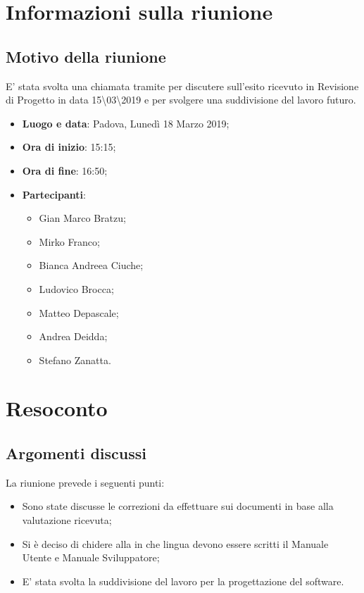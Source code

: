 \documentclass[a4paper,12pt]{article}
\begin{document}
	\tableofcontents
	\cleardoublepage
	\section{Informazioni sulla riunione}
	\subsection{Motivo della riunione} E' stata svolta una chiamata tramite   per discutere sull'esito ricevuto in Revisione di Progetto in data 15\textbackslash03\textbackslash2019 e per svolgere una suddivisione del lavoro futuro.
	\begin{itemize}
		\item \textbf{Luogo e data}: Padova, Lunedì \label{key}18 Marzo 2019;
		\item \textbf{Ora di inizio}: 15:15;
		\item \textbf{Ora di fine}: 16:50;
		\item \textbf{Partecipanti}:  
		\begin{itemize}
			\item Gian Marco Bratzu;
			\item Mirko Franco;
			\item Bianca Andreea Ciuche;
			\item Ludovico Brocca;
			\item Matteo Depascale;
			\item Andrea Deidda;
			\item Stefano Zanatta.
		\end{itemize}
	\end{itemize}
	
	
	\section{Resoconto}
	\subsection{Argomenti discussi}
	La riunione prevede i seguenti punti:
	\begin{itemize}		
		\item Sono state discusse le correzioni da effettuare sui documenti in base alla valutazione ricevuta;
		\item Si è deciso di chidere alla   in che lingua devono essere scritti il Manuale Utente e Manuale Sviluppatore;
		\item E' stata svolta la suddivisione del lavoro per la progettazione del software.
	\end{itemize}
\end{document}
